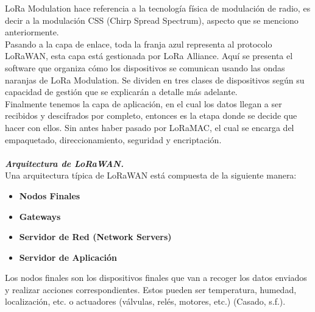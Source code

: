 \documentclass[12pt,a4paper]{article}
\begin{document}
	LoRa Modulation hace referencia a la tecnología física de modulación de radio, es decir a la modulación CSS (Chirp Spread Spectrum), aspecto que se menciono anteriormente.\\
	
	Pasando a la capa de enlace, toda la franja azul representa al protocolo LoRaWAN, esta capa está gestionada por LoRa Alliance. Aquí se presenta el software que organiza cómo los dispositivos se comunican usando las ondas naranjas de LoRa Modulation. Se dividen en tres clases de dispositivos según su capacidad de gestión que se explicarán a detalle más adelante.\\
	
	Finalmente tenemos la capa de aplicación, en el cual los datos llegan a ser recibidos y descifrados por completo, entonces es la etapa donde se decide que hacer con ellos. Sin antes haber pasado por LoRaMAC, el cual se encarga del empaquetado, direccionamiento, seguridad y encriptación.
	
	\paragraph*{}
	\textbf{\textit{Arquitectura de LoRaWAN.}} \mbox{}\\
	
	Una arquitectura típica de LoRaWAN está compuesta de la siguiente manera:
	\begin{itemize}
		\item \textbf{Nodos Finales}
		\item \textbf{Gateways}
		\item \textbf{Servidor de Red (Network Servers)}
		\item \textbf{Servidor de Aplicación}
	\end{itemize}
	
	Los nodos finales son los dispositivos finales que van a recoger los datos enviados y realizar acciones correspondientes. Estos pueden ser temperatura, humedad, localización, etc. o actuadores (válvulas, relés, motores, etc.) (Casado, s.f.).\\
	
\end{document}
